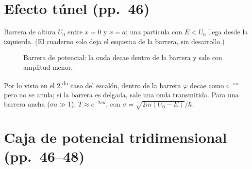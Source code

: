 \documentclass[11pt,a4paper]{article}
\newcommand{\pags}[1]{{\normalfont\small\color{gris}(pp.~#1)}}
\begin{document}
\section{Efecto túnel \pags{46}}

Barrera de altura $U_0$ entre $x=0$ y $x=a$; una partícula con $E<U_0$ llega desde la izquierda.
(El cuaderno solo deja el esquema de la barrera, sin desarrollo.)

\begin{figure}[H]
\centering
{}
\caption{Barrera de potencial: la onda decae dentro de la barrera y sale con amplitud menor.}
\end{figure}

\begin{obs}
Por lo visto en el 2.\textsuperscript{do} caso del escalón, dentro de la barrera $\varphi$ decae como $e^{-\sigma x}$ pero no se
anula; si la barrera es delgada, sale una onda transmitida. Para una barrera ancha ($\sigma a\gg1$),
$T\approx e^{-2\sigma a}$, con $\sigma=\sqrt{2m(U_0-E)}/\hbar$.
\end{obs}
\section{Caja de potencial tridimensional \pags{46--48}}
\end{document}
